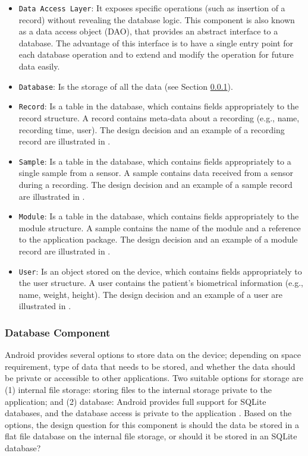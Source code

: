 \begin{itemize}
    \item[5.1] \verb|Data Access Layer|: It exposes specific operations (such as insertion of a record) without revealing the database logic. This component is also known as a data access object (DAO), that provides an abstract interface to a database. The advantage of this interface is to have a single entry point for each database operation and to extend and modify the operation for future data easily. 
    \item[5.2] \verb|Database|: Is the storage of all the data (see Section \ref{des:dc}).
    \item[5.2.1] \verb|Record|: Is a table in the database, which contains fields appropriately to the record structure. A record contains meta-data about a recording (e.g., name, recording time, user). The design decision and an example of a recording record are illustrated in .
    \item[5.2.2] \verb|Sample|: Is a table in the database, which contains fields appropriately to a single sample from a sensor. A sample contains data received from a sensor during a recording. The design decision and an example of a sample record are illustrated in .
    \item[5.2.3] \verb|Module|: Is a table in the database, which contains fields appropriately to the module structure. A sample contains the name of the module and a reference to the application package. The design decision and an example of a module record are illustrated in .
    \item[5.2.4] \verb|User|: Is an object stored on the device, which contains fields appropriately to the user structure. A user contains the patient's biometrical information (e.g., name, weight, height). The design decision and an example of a user are illustrated in .
\end{itemize}

\subsubsection{Database Component}\label{des:dc}

\noindent Android provides several options to store data on the device; depending on space requirement, type of data that needs to be stored, and whether the data should be private or accessible to other applications. Two suitable options for storage are (1) internal file storage: storing files to the internal storage private to the application; and (2) database: Android provides full support for SQLite databases, and the database access is private to the application \cite{android_storage}. Based on the options, the design question for this component is should the data be stored in a flat file database on the internal file storage, or should it be stored in an SQLite database?

